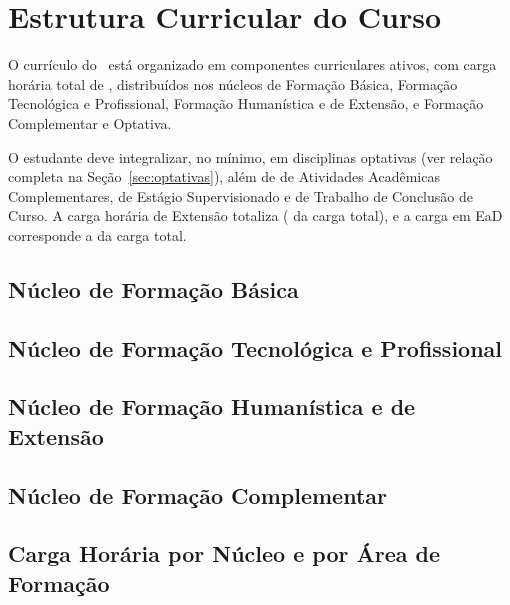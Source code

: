 \chapter{Estrutura Curricular do Curso}

O currículo do \ppccurso\ está organizado em  componentes curriculares ativos, com carga horária total de \textbf{}, distribuídos nos núcleos de Formação Básica, Formação Tecnológica e Profissional, Formação Humanística e de Extensão, e Formação Complementar e Optativa.

O estudante deve integralizar, no mínimo, \textbf{} em disciplinas optativas (ver relação completa na Seção~\ref{sec:optativas}), além de \textbf{} de Atividades Acadêmicas Complementares, \textbf{} de Estágio Supervisionado e \textbf{} de Trabalho de Conclusão de Curso. A carga horária de Extensão totaliza \textbf{} ( da carga total), e a carga em EaD corresponde a  da carga total.

\section{Núcleo de Formação Básica}


\section{Núcleo de Formação Tecnológica e Profissional}


\section{Núcleo de Formação Humanística e de Extensão}


\section{Núcleo de Formação Complementar}


\section{Carga Horária por Núcleo e por Área de Formação}




